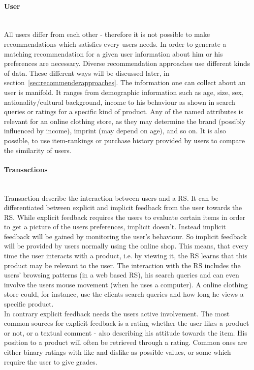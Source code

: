 \paragraph{User}\hfill\\
All users differ from each other - therefore it is not possible to make recommendations which satisfies every users needs.
In order to generate a matching recommendation for a given user information about him or his preferences are necessary.
Diverse recommendation approaches use different kinds of data.
These different ways will be discussed later, in section~\ref{sec:recommenderapproaches}.
The information one can collect about an user is manifold.
It ranges from demographic information such as age, size, sex, nationality/cultural background, income to his behaviour as shown in search queries or ratings for a specific kind of product.
Any of the named attributes is relevant for an online clothing store, as they may determine the brand (possibly influenced by income), imprint (may depend on age), and so on.\citep[p.8-9]{ricci:2011}
It is also possible, to use item-rankings or purchase history provided by users to compare the similarity of users.\citep[p.~377-378]{pradel:2011}

\paragraph{Transactions}\hfill\\
\label{sec:feedback}
Transaction describe the interaction between users and a RS.\citep[p.~9]{ricci:2011}
It can be differentiated between explicit and implicit feedback from the user towards the RS.
While explicit feedback requires the users to evaluate certain items in order to get a picture of the users preferences, implicit doesn't.
Instead implicit feedback will be gained by monitoring the user's behaviour.\citep[p.~76-77]{lops:2011}
So implicit feedback will be provided by users normally using the online shop.
This means, that every time the user interacts with a product, i.e. by viewing it, the RS learns that this product may be relevant to the user.\citep{taghipour:2007}
The interaction with the RS includes the users' browsing patterns (in a web based RS), his search queries and can even involve the users mouse movement (when he uses a computer).\citep[p.~146]{koren:2011}
A online clothing store could, for instance, use the clients search queries and how long he views a specific product.
\\
In contrary explicit feedback needs the users active involvement.
The most common sources for explicit feedback is a rating whether the user likes a product or not, or a textual comment - also describing his attitude towards the item.
His position to a product will often be retrieved through a rating.
Common ones are either binary ratings with like and dislike as possible values, or some which require the user to give grades.\citep[p.~77]{lops:2011}

